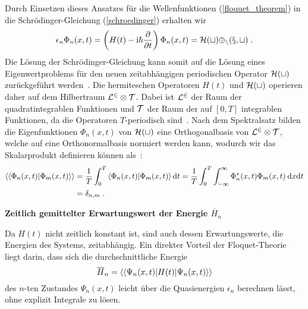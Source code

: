   Durch Einsetzen dieses Ansatzes für die Wellenfunktionen (\ref{floquet_theorem}) in die Schrödinger-Gleichung (\ref{schroedinger}) erhalten wir
  \begin{equation}
    \epsilon_n \Phi_n(x,t) = \left(H(t)-\text{i}\hbar\frac{\partial}{\partial t}\right)\Phi_n(x,t) = \cal{H}(t) \Phi_n(x,t) \; .
    \label{eigenwertproblem}
  \end{equation}
  Die Lösung der Schrödinger-Gleichung kann somit auf die Lösung eines Eigenwertproblems für den neuen zeitabhängigen periodischen Operator $\cal{H}(t)$ zurückgeführt werden~\cite{sherly}.
  Die hermiteschen Operatoren $H(t)$ und $\cal H(t)$ operieren daher auf dem Hilbertraum $\cal{L}^2 \otimes \cal{T}$.
  Dabei ist $\cal{L}^2$ der Raum der quadratintegrablen Funktionen und $\cal{T}$ der Raum der auf $[0,T]$ integrablen Funktionen, da die Operatoren $T$-periodisch sind~\cite{haengi}.
  Nach dem Spektralsatz bilden die Eigenfunktionen $\Phi_n(x,t)$ von $\cal{H}(t)$ eine Orthogonalbasis von $\cal{L}^2 \otimes \cal{T}$, welche auf eine Orthonormalbasis normiert werden kann, wodurch wir das Skalarprodukt definieren können als~\cite{haengi}:
  \begin{align}
    \braket{\braket{\Phi_n(x,t)|\Phi_m(x,t)}} &= \frac{1}{T} \int_0^T \braket{\Phi_n(x,t)|\Phi_m(x,t)} \text{d}t %
    = \frac{1}{T} \int_0^T \int_{-\infty}^{\infty} \Phi_n^*(x,t)\Phi_m(x,t) \: \text{d}x\text{d}t \notag\\
    &= \delta_{n,m} \; .
    \label{skalarprodukt_einzelner}
  \end{align}

\textbf{Zeitlich gemittelter Erwartungswert der Energie $\overline H_n$}

    Da $H(t)$ nicht zeitlich konstant ist, sind auch dessen Erwartungswerte, die Energien des Systems, zeitabhängig.
    Ein direkter Vorteil der Floquet-Theorie liegt darin, dass sich die durchschnittliche Energie
    \begin{equation}
      \overline H_n  = \braket{\braket{\Psi_n(x,t)|H(t)|\Psi_n(x,t)}}
    \end{equation}
    des $n$-ten Zustandes $\Psi_n(x,t)$ leicht über die Quasienergien $\epsilon_n$ berechnen lässt, ohne explizit Integrale zu lösen.

